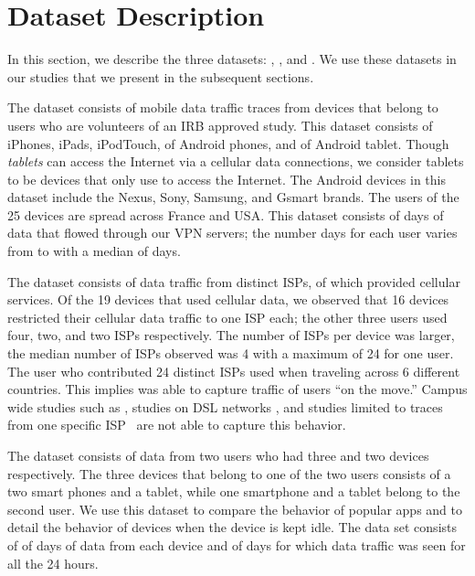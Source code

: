 \section{Dataset Description}
\label{sec:dataset}

In this section, we describe the three datasets: \moball, \mobcomp, and \mobexpt. 
We use these datasets in our studies that we present in the subsequent sections.

The \moball dataset consists of mobile data traffic traces from  devices that belong to  users who are volunteers of an IRB approved study. 
This dataset consists of  iPhones,  iPads,  iPodTouch,  of Android phones, and  of Android tablet.
Though \emph{tablets} can access the Internet via a cellular data connections, we consider tablets to be devices that only use \wifi to access the Internet. 
The Android devices in this dataset include the Nexus, Sony, Samsung, and Gsmart brands. 
The users of the 25 devices are spread across France and USA. 
This dataset consists of  days of data that flowed through our VPN servers; the number days for each user varies from  to  with a median of  days.  

The \moball dataset consists of data traffic from  distinct ISPs, of which  provided cellular services.  
Of the 19 devices that used cellular data, we observed that 16 devices restricted their cellular data traffic to one ISP each; the other three users used four, two, and two ISPs respectively. 
The number of \wifi ISPs per device was larger, the median number of ISPs observed was 4 with a maximum of 24 for one user. 
The user who contributed 24 distinct ISPs used \platname when traveling across 6 different countries. 
This implies \platname was able to capture traffic of users ``on the move.''
Campus wide studies such as \tbd{}, studies on DSL networks \cite{maier:mobtraffic}, and studies limited to traces from one specific ISP~\cite{vallina-rod:ads} are not able to capture this behavior.

The \mobcomp dataset consists of data from two users who had three and two devices respectively. 
The three devices that belong to one of the two users consists of a two smart phones and a tablet, while one smartphone and a tablet belong to the second user. 
We use this dataset to compare the behavior of popular apps and to detail the behavior of devices when the device is kept idle. 
The data set consists of  of days of data from each device and  of days for which data traffic was seen for all the 24 hours. 

